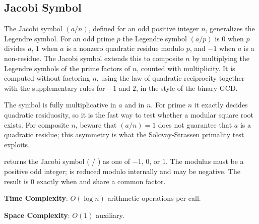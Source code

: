 \subsection{Jacobi Symbol}
\label{sec:6.3.7}
The Jacobi symbol $(a / n)$, defined for an odd positive integer $n$, generalizes the Legendre symbol. For an odd prime $p$ the Legendre symbol $(a / p)$ is $0$ when $p$ divides $a$, $1$ when $a$ is a nonzero quadratic residue modulo $p$, and $-1$ when $a$ is a non-residue. The Jacobi symbol extends this to composite $n$ by multiplying the Legendre symbols of the prime factors of $n$, counted with multiplicity. It is computed without factoring $n$, using the law of quadratic reciprocity together with the supplementary rules for $-1$ and $2$, in the style of the binary GCD.

The symbol is fully multiplicative in $a$ and in $n$. For prime $n$ it exactly decides quadratic residuosity, so it is the fast way to test whether a modular square root exists. For composite $n$, beware that $(a / n) = 1$ does not guarantee that $a$ is a quadratic residue; this asymmetry is what the Solovay-Strassen primality test exploits.

\begin{compactitem}
  \item {} returns the Jacobi symbol ( / ) as one of $-1$, $0$, or $1$. The modulus  must be a positive odd integer;  is reduced modulo  internally and may be negative. The result is $0$ exactly when  and  share a common factor.
\end{compactitem}

\textbf{Time Complexity}: $O(\log n)$ arithmetic operations per call.

\textbf{Space Complexity}: $O(1)$ auxiliary.

